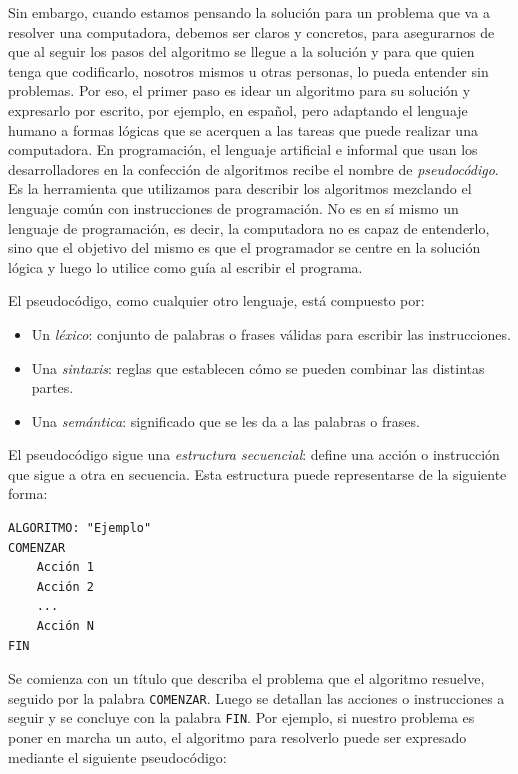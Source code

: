 \documentclass[
]{book}
\providecommand{\tightlist}{%
  \setlength{\itemsep}{0pt}\setlength{\parskip}{0pt}}
\begin{document}
Sin embargo, cuando estamos pensando la solución para un problema que va a resolver una computadora, debemos ser claros y concretos, para asegurarnos de que al seguir los pasos del algoritmo se llegue a la solución y para que quien tenga que codificarlo, nosotros mismos u otras personas, lo pueda entender sin problemas. Por eso, el primer paso es idear un algoritmo para su solución y expresarlo por escrito, por ejemplo, en español, pero adaptando el lenguaje humano a formas lógicas que se acerquen a las tareas que puede realizar una computadora. En programación, el lenguaje artificial e informal que usan los desarrolladores en la confección de algoritmos recibe el nombre de \emph{pseudocódigo}. Es la herramienta que utilizamos para describir los algoritmos mezclando el lenguaje común con instrucciones de programación. No es en sí mismo un lenguaje de programación, es decir, la computadora no es capaz de entenderlo, sino que el objetivo del mismo es que el programador se centre en la solución lógica y luego lo utilice como guía al escribir el programa.

El pseudocódigo, como cualquier otro lenguaje, está compuesto por:

\begin{itemize}
\tightlist
\item
  Un \emph{léxico}: conjunto de palabras o frases válidas para escribir las instrucciones.
\item
  Una \emph{sintaxis}: reglas que establecen cómo se pueden combinar las distintas partes.
\item
  Una \emph{semántica}: significado que se les da a las palabras o frases.
\end{itemize}

El pseudocódigo sigue una \emph{estructura secuencial}: define una acción o instrucción que sigue a otra en secuencia. Esta estructura puede representarse de la siguiente forma:

\begin{verbatim}
ALGORITMO: "Ejemplo"
COMENZAR
    Acción 1
    Acción 2
    ...
    Acción N
FIN
\end{verbatim}

Se comienza con un título que describa el problema que el algoritmo resuelve, seguido por la palabra \texttt{COMENZAR}. Luego se detallan las acciones o instrucciones a seguir y se concluye con la palabra \texttt{FIN}. Por ejemplo, si nuestro problema es poner en marcha un auto, el algoritmo para resolverlo puede ser expresado mediante el siguiente pseudocódigo:
\end{document}
